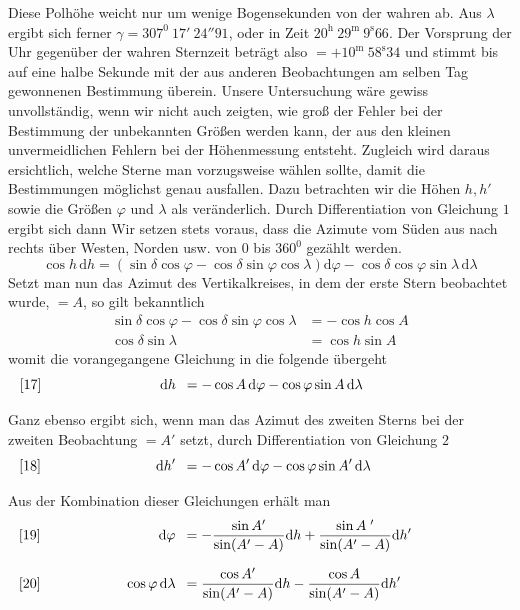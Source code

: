 Diese Polhöhe weicht nur um wenige Bogensekunden von der wahren ab. Aus $\lambda$ ergibt sich ferner $\gamma=307^0\ 17'\ 24''91$, oder in Zeit $20^{\mathrm h}\ 29^{\mathrm m}\ 9^{\mathrm s}66$. Der Vorsprung der Uhr gegenüber der wahren Sternzeit beträgt also $=+10^{\mathrm m}\ 58^{\mathrm s}34$ und stimmt bis auf eine halbe Sekunde mit der aus anderen Beobachtungen am selben Tag gewonnenen Bestimmung überein.
Unsere Untersuchung wäre gewiss unvollständig, wenn wir nicht auch zeigten, wie groß der Fehler bei der Bestimmung der unbekannten Größen werden kann, der aus den kleinen unvermeidlichen Fehlern bei der Höhenmessung entsteht. Zugleich wird daraus ersichtlich, welche Sterne man vorzugsweise wählen sollte, damit die Bestimmungen möglichst genau ausfallen. Dazu betrachten wir die Höhen $h,h'$ sowie die Größen $\varphi$ und $\lambda$ als veränderlich. Durch Differentiation von Gleichung $1$ ergibt sich dann
\expandafter\def\csname HistoricalNoteText1\endcsname{Wir setzen stets voraus, dass die Azimute vom Süden aus nach rechts über Westen, Norden usw. von $0$ bis $360^0$ gezählt werden.}
\begingroup
\newcommand{\GaussVIPoliDifferential}[3]{%
  \[\makebox[\linewidth][l]{%
    \makebox[0pt][l]{[#1]}%
    \makebox[.325\linewidth][r]{$\displaystyle #2$}\enspace
    $\displaystyle {}=#3$}\]%
}
\[
\cos h\,\mathrm dh=(\sin\delta\cos\varphi-\cos\delta\sin\varphi\cos\lambda)\mathrm d\varphi-\cos\delta\cos\varphi\sin\lambda\,\mathrm d\lambda
\]
Setzt man nun das Azimut des Vertikalkreises, in dem der erste Stern beobachtet wurde, $=A$, so gilt bekanntlich
\[
\begin{aligned}
\sin\delta\cos\varphi-\cos\delta\sin\varphi\cos\lambda&=-\cos h\cos A\\
\cos\delta\sin\lambda&=\cos h\sin A
\end{aligned}
\]
womit die vorangegangene Gleichung in die folgende übergeht
\GaussVIPoliDifferential{17}{\mathrm dh}{-\cos A\,\mathrm d\varphi-\cos\varphi\sin A\,\mathrm d\lambda}
Ganz ebenso ergibt sich, wenn man das Azimut des zweiten Sterns bei der zweiten Beobachtung $=A'$ setzt, durch Differentiation von Gleichung $2$
\GaussVIPoliDifferential{18}{\mathrm dh'}{-\cos A'\,\mathrm d\varphi-\cos\varphi\sin A'\,\mathrm d\lambda}
Aus der Kombination dieser Gleichungen erhält man
\GaussVIPoliDifferential{19}{\mathrm d\varphi}{-\frac{\sin A'}{\sin(A'-A)}\mathrm dh+\frac{\sin A\;{}'}{\sin(A'-A)}\mathrm dh'}
\GaussVIPoliDifferential{20}{\cos\varphi\,\mathrm d\lambda}{\frac{\cos A'}{\sin(A'-A)}\mathrm dh-\frac{\cos A}{\sin(A'-A)}\mathrm dh'}
\endgroup


